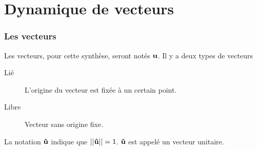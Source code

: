 

\usepackage{tensor}
\usepackage{bm}

\newtheorem{defin}{Definition}[section]
\newtheorem{nota}[defin]{Notation}
\newtheorem{prop}[defin]{Propriete}

\newcommand\dist{\mathrm{dist}}
\newcommand\Ker{\mathrm{Ker}}
\newcommand\fv[1]{{\bf #1}} %
\newcommand\fvd[1]{\dot{\bf #1}} %
\newcommand\fvdd[1]{\ddot{\bf #1}} %
\newcommand\fvr[1]{\mathring{\bf #1}} %
\newcommand\fvrr[1]{\overset{\circ\circ}{\bf #1}} %
\newcommand\uv[1]{{\bf\hat{ #1}}} %
\newcommand\ui{{\bf\hat{I}}} %
\newcommand\uj{{\bf\hat{J}}} %
\newcommand\uk{{\bf\hat{K}}} %
\newcommand\wrt[2]{\ensuremath{\tensor*[_{ #1}]{ #2}{}}} %
\newcommand\wtr[3]{\ensuremath{\tensor*[_{ #1}]{ #2}{^{ #3}}}} %
\newcommand\omegaf{{\bm \omega}}
\newcommand\omegafr{\mathring{\bm \omega}}
\newcommand\omegafd{\dot{\bm \omega}}
\newcommand\omegaft{\tilde{\bm \omega}}
\newcommand\omegaftr{\mathring{\tilde{\bm \omega}}}
\newcommand\omegat{\tilde{\omega}}
\newcommand\omegatd{\tilde{\dot{\omega}}}
\newcommand\ine{{\bf I}}
\newcommand\st{{\bf L}}
\newcommand\pst{{\bf M}}
\newcommand\lm{{\bf N}}
\newcommand\am{{\bf H}}
\newcommand\amd{\dot{\am}}
\newcommand\fo{{\bf F}}
\newcommand\po{\mathcal{P}}
\newcommand\xg{\ensuremath{\fv{R}}}
\newcommand\xgd{\ensuremath{\fvd{R}}}
\newcommand\xgdd{\ensuremath{\fvdd{R}}}
\newcommand\dvec[1]{\dot{\vec{ #1}}}
\newcommand\ddvec[1]{\ddot{\vec{ #1}}}
\newcommand\qp{\dot{q}}
\newcommand\dqp{\Delta \dot{q}}


\part{Dynamique de vecteurs}
\section{Les vecteurs}
Les vecteurs, pour cette synthèse, seront notés $\fv{u}$.
Il y a deux types de vecteurs
\begin{description}
	\item[Lié] L'origine du vecteur est fixée à un certain point.
	\item[Libre] Vecteur sans origine fixe.
\end{description}
La notation $\uv{u}$ indique que $||\uv{u}|| = 1$.
$\uv{u}$ est appelé un vecteur unitaire.

